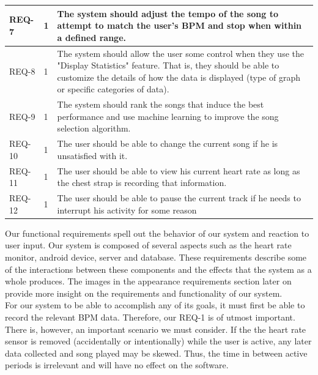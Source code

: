\documentclass[letterpaper,english, 12pt]{scrreprt}
\begin{document}
\begin{center}
	\begin{tabular}{|C{2cm}|C{2cm}|C{8cm}|}
		\hline
			REQ-7 & 1 & The system should adjust the tempo of the song to attempt to match the user's BPM and stop when within a defined range. \\
		\hline
			REQ-8 & 1 & The system should allow the user some control when they use the "Display Statistics" feature. That is, they should be able to customize the details of how the data is displayed (type of graph or specific categories of data).\\
		\hline
			REQ-9 & 1 & The system should rank the songs that induce the best performance and use machine learning to improve the song selection algorithm. \\
		\hline
                        REQ-10 & 1 & The user should be able to change the current song if he is unsatisfied with it. \\
                \hline
                        REQ-11 & 1 & The user should be able to view his current heart rate as long as the chest strap is recording that information. \\
		\hline
			REQ-12 & 1 & The user should be able to pause the current track if he needs to interrupt his activity for some reason \\
		\hline
	\end{tabular}
\end{center}

Our functional requirements spell out the behavior of our system and reaction to
user input. Our system is composed of several aspects such as the heart rate
monitor, android device, server and database. These requirements
describe some of the interactions between these components and the effects that
the system as a whole produces. The images in the appearance requirements section
later on provide more insight on the requirements and functionality of our system. \\

For our system to be able to accomplish any of its goals, it must first be able to record the relevant BPM data. Therefore, our REQ-1 is of utmost important. There is, however, an important scenario we must consider. If the the heart rate sensor is removed (accidentally or intentionally) while the user is active, any later data collected and song played may be skewed. Thus, the time in between active periods is irrelevant and will have no effect on the software.\\
\end{document}

